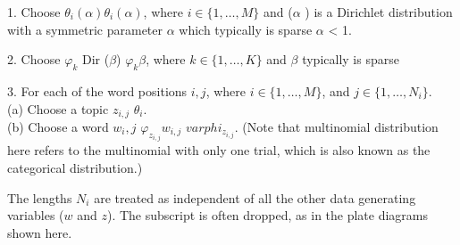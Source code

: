 1. Choose $\theta _{i}(\alpha ) \theta _{i} (\alpha)$, where $i\in \{1,\dots ,M\}$ and ($\alpha$ ) is a Dirichlet distribution with a symmetric parameter $\alpha$ which typically is sparse $\alpha$ < 1.

2. Choose $\varphi _{k}$ {Dir} ($\beta$) $\varphi _{k} \beta$, where $k\in \{1,\dots ,K\}$ and $\beta$ typically is sparse

3. For each of the word positions $i,j$, where $i\in \{1,\dots ,M\}$, and $j\in \{1,\dots ,N_{i}\}$. \\

(a) Choose a topic $z_{i,j}$ $\theta_{i}$.\\
(b) Choose a word $w_i,j$ $\varphi_{z_{i,j}} w_{i,j}$ $varphi _{z_{i,j}}$.
(Note that multinomial distribution here refers to the multinomial with only one trial, which is also known as the categorical distribution.)

The lengths $N_{i}$ are treated as independent of all the other data generating variables ($w$ and $z$). The subscript is often dropped, as in the plate diagrams shown here.


